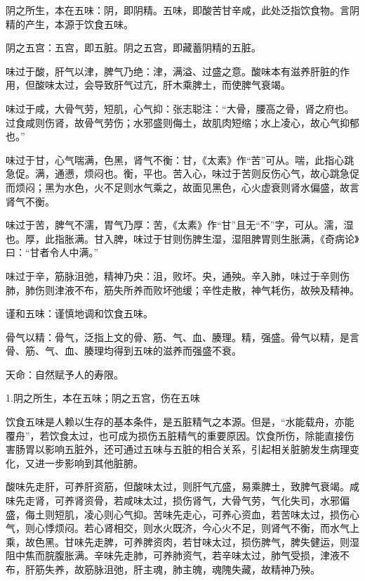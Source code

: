 \documentclass[draft,12pt]{ctexbook}
\begin{document}

\begin{jiaozhu}
	\item 阴之所生，本在五味：阴，即阴精。五味，即酸苦甘辛咸，此处泛指饮食物。言阴精的产生，本源于饮食五味。
	\item 阴之五宫：五宫，即五脏。阴之五宫，即藏蓄阴精的五脏。
	\item 味过于酸，肝气以津，脾气乃绝：津，满溢、过盛之意。酸味本有滋养肝脏的作用，但酸味太过，会导致肝气过亢，肝木乘脾土，而使脾气衰竭。
	\item 味过于咸，大骨气劳，短肌，心气抑：张志聪注：“大骨，腰高之骨，肾之府也。过食咸则伤肾，故骨气劳伤；水邪盛则侮土，故肌肉短缩；水上凌心，故心气抑郁也。”
	\item 味过于甘，心气喘满，色黑，肾气不衡：甘，《太素》作“苦”可从。喘，此指心跳急促。满，通懑，烦闷也。衡，平也。苦入心，味过于苦则反伤心气，故心跳急促而烦闷；黑为水色，火不足则水气乘之，故面见黑色，心火虚衰则肾水偏盛，故言肾气不衡。
	\item 味过于苦，脾气不濡，胃气乃厚：苦，《太素》作“甘”且无“不”字，可从。濡，湿也。厚，此指胀满。甘入脾，味过于甘则伤脾生湿，湿阻脾胃则生胀满，《奇病论》曰：“甘者令人中满。”
	\item 味过于辛，筋脉沮弛，精神乃央：沮，败坏。央，通殃。辛入肺，味过于辛则伤肺，肺伤则津液不布，筋失所养而败坏弛缓；辛性走散，神气耗伤，故殃及精神。
	\item 谨和五味：谨慎地调和饮食五味。
	\item 骨气以精：骨气，泛指上文的骨、筋、气、血、腠理。精，强盛。骨气以精，是言骨、筋、气、血、腠理均得到五味的滋养而强盛不衰。
	\item 天命：自然赋予人的寿限。
\end{jiaozhu}


1.阴之所生，本在五味；阴之五宫，伤在五味

饮食五味是人赖以生存的基本条件，是五脏精气之本源。但是，“水能载舟，亦能覆舟”，若饮食太过，也可成为损伤五脏精气的重要原因。饮食所伤，除能直接伤害肠胃以影响五脏外，还可通过五味与五脏的相合关系，引起相关脏腑发生病理变化，又进一步影响到其他脏腑。

酸味先走肝，可养肝资筋，但酸味太过，则肝气亢盛，易乘脾土，致脾气衰竭。咸味先走肾，可养肾资骨，若咸味太过，损伤肾气，大骨气劳，气化失司，水邪偏盛，侮土则短肌，凌心则心气抑。苦味先走心，可养心资血，若苦味太过，损伤心气，则心悸烦闷。若心肾相交，则水火既济，今心火不足，则肾气不衡，而水气上乘，故色黑。甘味先走脾，可养脾资肉，若甘味太过，损伤脾气，脾失健运，则湿阻中焦而脘腹胀满。辛味先走肺，可养肺资气，若辛味太过，肺气受损，津液不布，肝筋失养，故筋脉沮弛，肝主魂，肺主魄，魂隗失藏，故精神乃殃。
\end{document}
